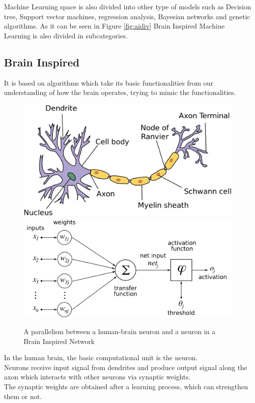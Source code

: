 Machine Learning space is also divided into other type of models such as Decision tree, Support vector machines, regression analysis, Bayesian networks and genetic algorithms.
As it can be seen in Figure \ref{fig:aidiv} Brain Inspired Machine Learning is also divided in subcategories.
\subsection{Brain Inspired}
It is based on algorithms which take its basic functionalities from our understanding of how the brain operates, trying to mimic the functionalities.

\begin{figure}[H]
\centering
\captionsetup{justification=centering}
\includegraphics[scale=0.15]{./figure/human_neuron.PNG}\\

\includegraphics[scale=0.15]{./figure/nn_neuron.PNG}

\caption{A parallelism between a human-brain neuron and a neuron in a Brain Inspired Network}
\label{fig:neuron}
\end{figure}
In the human brain, the basic computational unit is the neuron.\\ Neurons receive input signal from dendrites and produce output signal along the axon which interacts with other neurons via synaptic weights.\\ The synaptic weights are obtained after a learning process, which can strengthen them or not.

